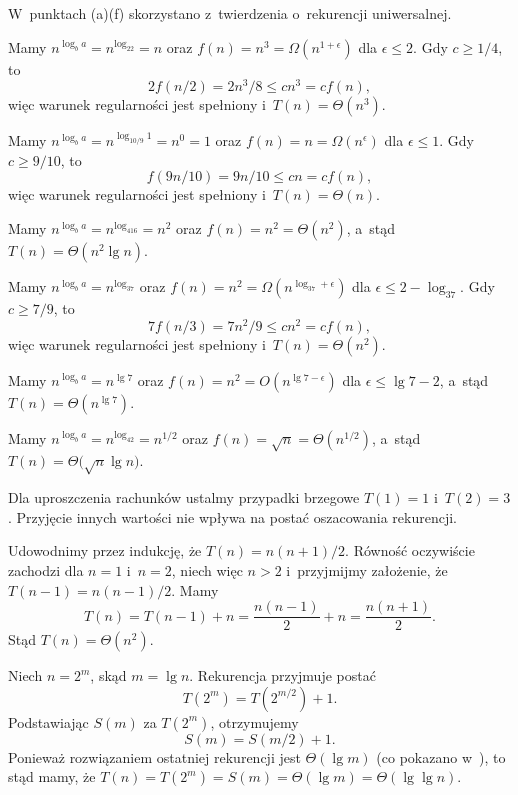 W~punktach (a)\nbendash(f) skorzystano z~twierdzenia o~rekurencji uniwersalnej.

\subproblem %
Mamy $n^{\log_ba}=n^{\log_22}=n$ oraz $f(n)=n^3=\Omega(n^{1+\epsilon})$ dla $\epsilon\le2$.
Gdy $c\ge1/4$, to
\[
	2f(n/2) = 2n^3\!/8 \le cn^3 = cf(n),
\]
więc warunek regularności jest spełniony i~$T(n)=\Theta(n^3)$.

\subproblem %
Mamy $n^{\log_ba}=n^{\log_{10/9}1}=n^0=1$ oraz $f(n)=n=\Omega(n^\epsilon)$ dla $\epsilon\le1$.
Gdy $c\ge9/10$, to
\[
	f(9n/10) = 9n/10 \le cn = cf(n),
\]
więc warunek regularności jest spełniony i~$T(n)=\Theta(n)$.

\subproblem %
Mamy $n^{\log_ba}=n^{\log_416}=n^2$ oraz $f(n)=n^2=\Theta(n^2)$, a~stąd $T(n)=\Theta(n^2\lg n)$.

\subproblem %
Mamy $n^{\log_ba}=n^{\log_37}$ oraz $f(n)=n^2=\Omega(n^{\log_37+\epsilon})$ dla $\epsilon\le2-\log_37$.
Gdy $c\ge7/9$, to
\[
	7f(n/3) = 7n^2\!/9 \le cn^2 = cf(n),
\]
więc warunek regularności jest spełniony i~$T(n)=\Theta(n^2)$.

\subproblem %
Mamy $n^{\log_ba}=n^{\lg7}$ oraz $f(n)=n^2=O(n^{\lg7-\epsilon})$ dla $\epsilon\le\lg7-2$, a~stąd $T(n)=\Theta(n^{\lg7})$.

\subproblem %
Mamy $n^{\log_ba}=n^{\log_42}=n^{1/2}$ oraz $f(n)=\sqrt{n}=\Theta(n^{1/2})$, a~stąd $T(n)=\Theta\bigl(\!\sqrt{n}\lg n\bigr)$.

\subproblem %
Dla uproszczenia rachunków ustalmy przypadki brzegowe $T(1)=1$ i~$T(2)=3$.
Przyjęcie innych wartości nie wpływa na postać oszacowania rekurencji.

Udowodnimy przez indukcję, że $T(n)=n(n+1)/2$.
Równość oczywiście zachodzi dla $n=1$ i~$n=2$, niech więc $n>2$ i~przyjmijmy założenie, że $T(n-1)=n(n-1)/2$.
Mamy
\[
	T(n) = T(n-1)+n = \frac{n(n-1)}{2}+n = \frac{n(n+1)}{2}.
\]
Stąd $T(n)=\Theta(n^2)$.

\subproblem %
Niech $n=2^m$, skąd $m=\lg n$.
Rekurencja przyjmuje postać
\[
	T(2^m) = T(2^{m/2})+1.
\]
Podstawiając $S(m)$ za $T(2^m)$, otrzymujemy
\[
	S(m) = S(m/2)+1.
\]
Ponieważ rozwiązaniem ostatniej rekurencji jest $\Theta(\lg m)$ (co pokazano w~), to stąd mamy, że $T(n)=T(2^m)=S(m)=\Theta(\lg m)=\Theta(\lg\lg n)$.
